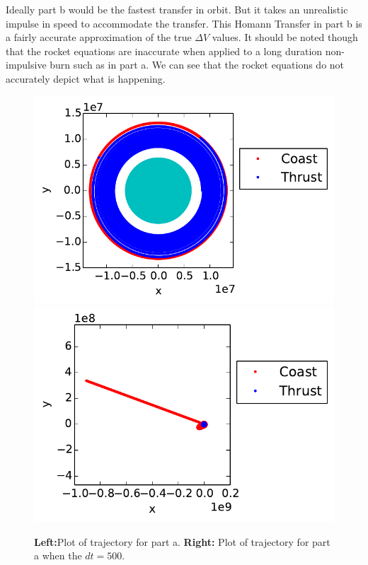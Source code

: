 \documentclass[cleanfoot,cleanhead,onecolumn,10pt,notitlepage]{asme2e}
\begin{document}
Ideally part b would be the fastest transfer in orbit.  But it takes an unrealistic impulse in speed to accommodate the transfer.  This Homann Transfer in part b is a fairly accurate approximation of the true $\Delta V$ values.   It should be noted though that the rocket equations are inaccurate when applied to a long duration non-impulsive burn such as in part a.  We can see that the rocket equations do not accurately depict what is happening.  


%
%



\begin{figure}[t]
\begin{center}
    \includegraphics[width=0.45\linewidth]{../python_stuff/part_a.pdf}
    \includegraphics[width=0.45\linewidth]{../python_stuff/part_a_blowup.pdf}
    \caption{\textbf{Left:}Plot of trajectory for part a.  \textbf{Right:}  Plot of trajectory for part a when the $dt = 500$.}
    \label{fig:aa}
\end{center}
\end{figure}
\end{document}
